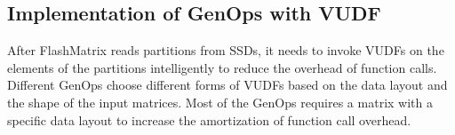 


\subsection{Implementation of GenOps with VUDF}

After FlashMatrix reads partitions from SSDs, it needs to invoke VUDFs on
the elements of the partitions intelligently to reduce the overhead of function
calls. Different GenOps choose different forms of VUDFs based on the data layout
and the shape of the input matrices. Most of the GenOps requires a matrix with
a specific data layout to increase the amortization of function call overhead.

